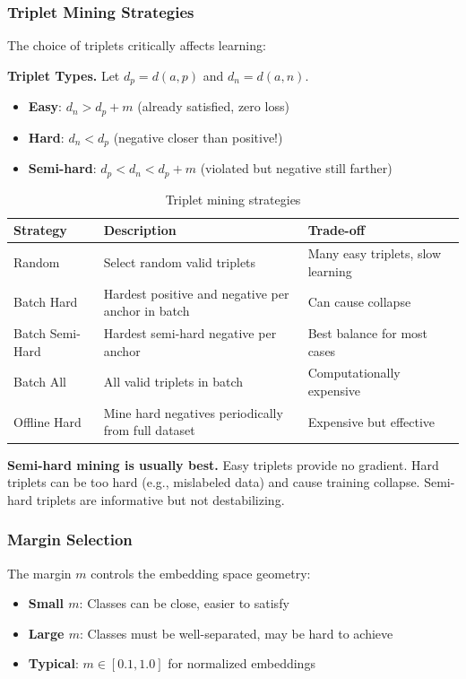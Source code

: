 \subsubsection{Triplet Mining Strategies}

The choice of triplets critically affects learning:

\textbf{Triplet Types.} Let $d_p = d(a, p)$ and $d_n = d(a, n)$.
\begin{itemize}
    \item \textbf{Easy}: $d_n > d_p + m$ (already satisfied, zero loss)
    \item \textbf{Hard}: $d_n < d_p$ (negative closer than positive!)
    \item \textbf{Semi-hard}: $d_p < d_n < d_p + m$ (violated but negative still farther)
\end{itemize}

\begin{table}[H]
\centering
\caption{Triplet mining strategies}
\begin{tabularx}{\textwidth}{lXX}
\toprule
\textbf{Strategy} & \textbf{Description} & \textbf{Trade-off} \\
\midrule
Random & Select random valid triplets & Many easy triplets, slow learning \\
Batch Hard & Hardest positive and negative per anchor in batch & Can cause collapse \\
Batch Semi-Hard & Hardest semi-hard negative per anchor & Best balance for most cases \\
Batch All & All valid triplets in batch & Computationally expensive \\
Offline Hard & Mine hard negatives periodically from full dataset & Expensive but effective \\
\bottomrule
\end{tabularx}
\end{table}

\begin{keyinsight}
\textbf{Semi-hard mining is usually best.} Easy triplets provide no gradient. Hard triplets can be too hard (e.g., mislabeled data) and cause training collapse. Semi-hard triplets are informative but not destabilizing.
\end{keyinsight}

\subsubsection{Margin Selection}

The margin $m$ controls the embedding space geometry:
\begin{itemize}
    \item \textbf{Small $m$}: Classes can be close, easier to satisfy
    \item \textbf{Large $m$}: Classes must be well-separated, may be hard to achieve
    \item \textbf{Typical}: $m \in [0.1, 1.0]$ for normalized embeddings
\end{itemize}

